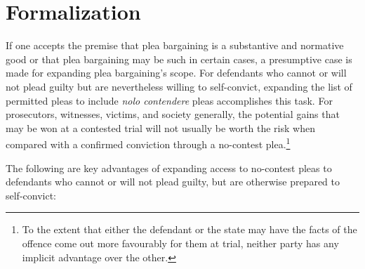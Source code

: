 \section{Formalization}

If one accepts the premise that plea bargaining is a substantive and normative good or that plea bargaining may be such in certain cases, a presumptive case is made for expanding plea bargaining's scope. For defendants who cannot or will not plead guilty but are nevertheless willing to self-convict, expanding the list of permitted pleas to include \textit{nolo contendere} pleas accomplishes this task. For prosecutors, witnesses, victims, and society generally, the potential gains that may be won at a contested trial will not usually be worth the risk when compared with a confirmed conviction through a no-contest plea.\footnote{To the extent that either the defendant or the state may have the facts of the offence come out more favourably for them at trial, neither party has any implicit advantage over the other.}

The following are key advantages of expanding access to no-contest pleas to defendants who cannot or will not plead guilty, but are otherwise prepared to self-convict:

